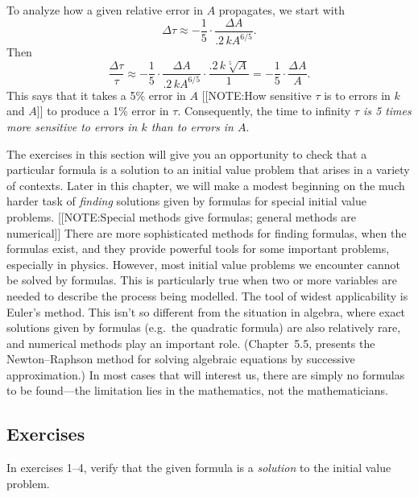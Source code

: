 	To analyze how a given relative error in $A$ propagates, we start with
	\[
\Delta \tau \approx -\dfrac{1}{5} \cdot
		\dfrac{\Delta A}{.2\,k A^{6/5}}.
\]
Then
	\[
\dfrac{\Delta \tau}{\tau} \approx -\dfrac{1}{5} \cdot
		\dfrac{\Delta A}{.2\,k A^{6/5}} \cdot
			\dfrac{.2\,k\sqrt[5]{A}}{1} =
		-\dfrac{1}{5} \cdot \dfrac{\Delta A}{A}.
\]
This says that it takes a 5\% error in $A$ 
	[[NOTE:How sensitive $\tau$ is to errors in $k$ and $A$]]
to produce a 1\% error in $\tau$.  Consequently, the time to infinity {\em $\tau$ is 5 times more sensitive to errors in $k$ than to errors in $A$}.
\label{supergrowth errors-end}



	The exercises in this section will give you an opportunity to check that a particular formula is a solution to an initial value problem that arises in a variety of contexts.  Later in this chapter, we will make a modest beginning on the much harder task of {\em finding\/} solutions given by formulas for special initial value problems.  
	[[NOTE:Special methods give formulas; general methods are numerical]]
There are more sophisticated methods for finding formulas, when the formulas exist, and they provide powerful tools for some important problems, especially in physics.  However, most initial value problems we encounter cannot be solved by formulas.  This is particularly true when two or 
more variables are needed to describe the process being modelled.  The tool of widest applicability is Euler's method.  This isn't so different from the situation in algebra, where exact solutions given by formulas (e.g.\ the quadratic formula) are also relatively rare, and numerical methods play an important role.  (Chapter~5.5, presents the Newton--Raphson method for solving algebraic equations by successive approximation.)  In most cases that will interest us, there are simply no formulas to be found---the limitation lies in the mathematics, not the mathematicians.  
\label{DEs w/ params-end}

\subsection{Exercises}
\label{subsec:exercises}


In exercises 1--4, verify that the given formula is a {\em solution\/} to the initial value problem.


